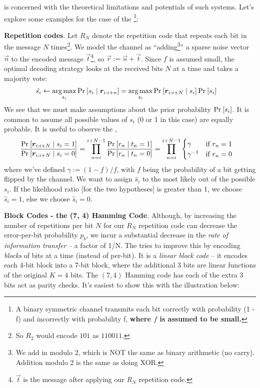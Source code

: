 \documentclass[11pt]{article}
\begin{document}
 is concerned with the theoretical limitations and potentials of such systems. Let's explore some examples for the case of the \footnote{A binary symmetric channel transmits each bit correctly with probability (1 - f) and incorrectly with probability f, \textbf{where $f$ is assumed to be small.}}:
\begin{compactitem}
	\item \textbf{Repetition codes}. Let $R_N$ denote the repetition code that repeats each bit in the message $N$ times\footnote{So $R_2$ would encode $101$ as $110011$.}. We model the channel as ``adding\footnote{We add in modulo 2, which is NOT the same as binary arithmetic (no carry). Addition modulo 2 is the same as doing XOR.}'' a sparse noise vector $\vec{n}$ to the encoded message $\vec{t}$\footnote{$\vec t$ is the message after applying our $R_N$ repetition code.}, so $\vec{r} := \vec{n} + \vec{t}$. Since $f$ is assumed small, the optimal decoding strategy looks at the received bits $N$ at a time and takes a majority vote:
	\begin{align}
	\hat{s_i} &\leftarrow \argmax_{s_i} \Prob{ s_i \mid \vec[i:i+n]{r} } = \argmax_{s_i} \Prob{ \vec[i:i+N]{r} \mid s_i } \Prob{ s_i } 
	\end{align}
	We see that we must make assumptions about the prior probability $\Prob{s_i}$. It is common to assume all possible values of $s_i$ (0 or 1 in this case) are equally probable. It is useful to observe the ,
	\begin{align}
	\frac{  \Prob{ \vec[i:i+N]{r} \mid s_i = 1 }  }{   \Prob{ \vec[i:i+N]{r} \mid s_i = 0 } }
	&= \prod_{n = i}^{i + N - 1} \frac{  \Prob{ r_n \mid t_n = 1 }  }{   \Prob{ r_n \mid t_n = 0 } } 
	=  \prod_{n = i}^{i + N - 1} \begin{cases}
	\gamma & \text{if } r_n = 1 \\
	\gamma^{-1} & \text{if } r_n = 0
	\end{cases}
	\end{align}
	where we've defined $\gamma := (1 - f) / f$, with $f$ being the probability of a bit getting flipped by the channel. We want to assign $\hat s_i$ to the most likely  out of the possible $s_i$. If the likelihood ratio [for the two hypotheses] is greater than 1, we choose $\hat s_i = 1$, else we choose $ \hat s_i = 0$.  
	
	\item \textbf{Block Codes - the (7, 4) Hamming Code}. Although, by increasing the number of repetitions per bit $N$ for our $R_N$ repetition code can decrease the error-per-bit probability $p_b$, we incur a substantial decrease in the \textit{rate of information transfer} -- a factor of 1/N. The  tries to improve this by encoding \textit{blocks} of bits at a time (instead of per-bit). It is a \textit{linear block code} -- it encodes each 4-bit block into a 7-bit block, where the additional 3 bits are linear functions of the original $K=4$ bits. The $(7, 4)$ Hamming code has each of the extra 3 bits act as parity checks. It's easiest to show this with the illustration below:
	

\end{compactitem}
\end{document}
